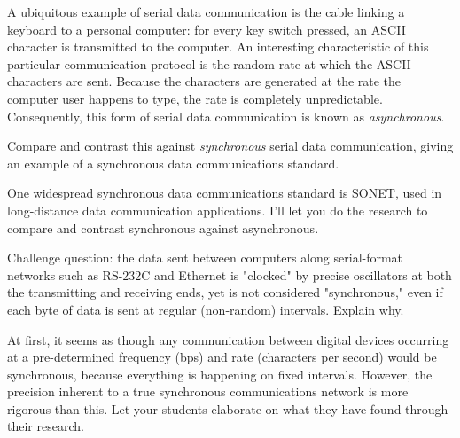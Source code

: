 

A ubiquitous example of serial data communication is the cable linking a keyboard to a personal computer: for every key switch pressed, an ASCII character is transmitted to the computer.  An interesting characteristic of this particular communication protocol is the random rate at which the ASCII characters are sent.  Because the characters are generated at the rate the computer user happens to type, the rate is completely unpredictable.  Consequently, this form of serial data communication is known as {\it asynchronous}.

Compare and contrast this against {\it synchronous} serial data communication, giving an example of a synchronous data communications standard.







One widespread synchronous data communications standard is SONET, used in long-distance data communication applications.  I'll let you do the research to compare and contrast synchronous against asynchronous.

\vskip 10pt

Challenge question: the data sent between computers along serial-format networks such as RS-232C and Ethernet is "clocked" by precise oscillators at both the transmitting and receiving ends, yet is not considered "synchronous," even if each byte of data is sent at regular (non-random) intervals.  Explain why.







At first, it seems as though any communication between digital devices occurring at a pre-determined frequency (bps) and rate (characters per second) would be synchronous, because everything is happening on fixed intervals.  However, the precision inherent to a true synchronous communications network is more rigorous than this.  Let your students elaborate on what they have found through their research.




